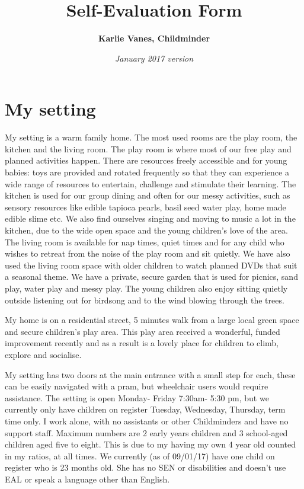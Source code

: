 \documentclass[10pt,a4paper]{report}
\title{\huge\bfseries\sffamily\color{MSBlue}Self-Evaluation Form}
\author{\Large\bfseries\sffamily\color{MSLightBlue}Karlie Vanes, Childminder}
\date{\itshape\subsectionfont January 2017 version}
\begin{document}
\maketitle

\tableofcontents

\chapter{My setting}

My setting is a warm family home. The most used rooms are the play room, the kitchen and the living room. The play room is where most of our free play and planned activities happen. There are  resources freely accessible and for young babies: toys are provided and rotated frequently so that they can experience a wide range of resources to entertain, challenge and stimulate their learning. The kitchen is used for our group dining and often for our messy activities, such as sensory resources like edible tapioca pearls, basil seed water play, home made edible slime etc. We also find ourselves singing and moving to music a lot in the kitchen, due to the wide open space and the young children's love of the area. The living room is available for nap times, quiet times and for any child who wishes to retreat from the noise of the play room and sit quietly. We have also used the living room space with older children to watch planned DVDs that suit a seasonal theme. We have a private, secure garden that is used for picnics, sand play, water play and messy play. The young children also enjoy sitting quietly outside listening out for birdsong and to the wind blowing through the trees. 

My home is on a residential street, 5 minutes walk from a large local green space and secure children's play area. This play area received a wonderful, funded improvement recently and as a result is a lovely place for children to climb, explore and socialise. 

My setting has two doors at the main entrance with a small step for each, these can be easily navigated with a pram, but wheelchair users would require assistance. The setting is open Monday- Friday 7:30am- 5:30 pm, but we currently only have children on register Tuesday, Wednesday, Thursday, term time only. I work alone, with no assistants or other Childminders and have no support staff. Maximum numbers are 2 early years children and 3 school-aged children aged five to eight. This is due to my having my own 4 year old counted in my ratios, at all times. We currently (as of 09/01/17) have one child on register who is 23 months old. She has no SEN or disabilities and doesn't use EAL or speak a language other than English. 
\end{document}
